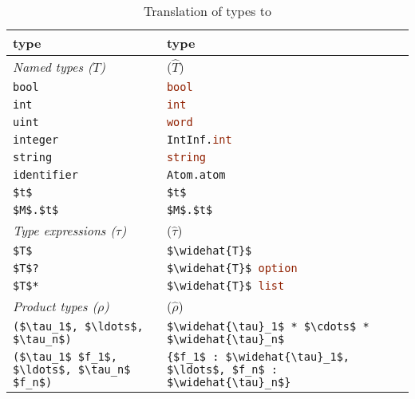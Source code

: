\begin{table}[tp]
  \caption{Translation of \asdl{} types to \sml{}}
  \label{tbl:asdl-to-sml}
  \begin{center}
    \begin{tabular}{|l|p{3in}|}
      \hline
      \textbf{\asdl{} type} & \textbf{\sml{} type} \\
      \hline
      \textit{Named types ($T$)} &  ($\widehat{T}$) \\[0.25em]
      \lstinline!bool! & \lstinline[language=SML]!bool! \\[0.5em]
      \lstinline!int! & \lstinline[language=SML]!int! \\[0.5em]
      \lstinline!uint! & \lstinline[language=SML]!word! \\[0.5em]
      \lstinline!integer! & \lstinline[language=SML]!IntInf.int! \\[0.5em]
      \lstinline!string! & \lstinline[language=SML]!string! \\[0.5em]
      \lstinline!identifier! & \lstinline[language=SML]!Atom.atom! \\[0.5em]
      \lstinline[language=ASDL,mathescape=true]@$t$@ & \lstinline[language=SML,mathescape=true]!$t$! \\[0.5em]
      \lstinline[language=ASDL,mathescape=true]@$M$.$t$@ & \lstinline[language=SML,mathescape=true]!$M$.$t$! \\[0.5em]
      \hline
      \textit{Type expressions ($\tau$)} &  ($\widehat{\tau}$) \\[0.25em]
      \lstinline[language=ASDL,mathescape=true]@$T$@ & \lstinline[language=SML,mathescape=true]!$\widehat{T}$! \\[0.5em]
      \lstinline[language=ASDL,mathescape=true]@$T$?@ & \lstinline[language=SML,mathescape=true]!$\widehat{T}$ option! \\[0.5em]
      \lstinline[language=ASDL,mathescape=true]@$T$*@ & \lstinline[language=SML,mathescape=true]!$\widehat{T}$ list! \\[0.5em]
      \hline
      \textit{Product types ($\rho$)} & ($\widehat{\rho}$) \\[0.25em]
      \lstinline[language=ASDL,mathescape=true]@($\tau_1$, $\ldots$, $\tau_n$)@
        & \lstinline[language=SML,mathescape=true]!$\widehat{\tau}_1$ * $\cdots$ * $\widehat{\tau}_n$! \\[0.5em]
      \lstinline[language=ASDL,mathescape=true]@($\tau_1$ $f_1$, $\ldots$, $\tau_n$ $f_n$)@
        & \lstinline[language=SML,mathescape=true]!{$f_1$ : $\widehat{\tau}_1$, $\ldots$, $f_n$ : $\widehat{\tau}_n$}! \\[0.5em]

\end{tabular}
\end{center}
\end{table}
